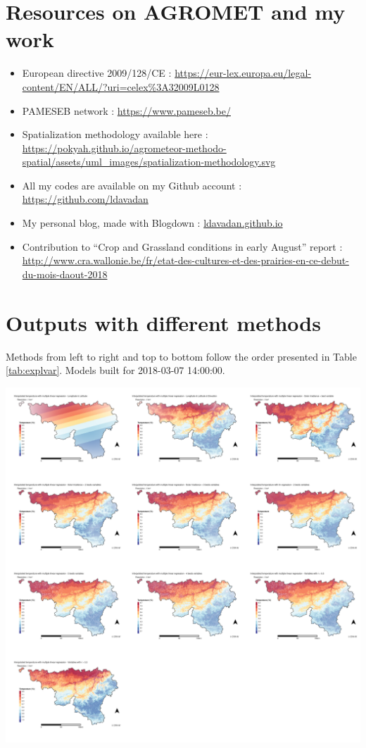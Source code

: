 \documentclass[12pt,twoside]{reedthesis}
\theoremstyle{definition}
\theoremstyle{definition}
\theoremstyle{definition}
\theoremstyle{remark}
\begin{document}
\chapter{Resources on AGROMET and my
work}\label{resources-on-agromet-and-my-work}
\begin{itemize}
\item
  European directive 2009/128/CE :
  \url{https://eur-lex.europa.eu/legal-content/EN/ALL/?uri=celex\%3A32009L0128}
\item
  PAMESEB network : \url{https://www.pameseb.be/}
\item
  Spatialization methodology available here :
  \url{https://pokyah.github.io/agrometeor-methodo-spatial/assets/uml_images/spatialization-methodology.svg}
\item
  All my codes are available on my Github account :
  \url{https://github.com/ldavadan}
\item
  My personal blog, made with Blogdown : \url{ldavadan.github.io}
\item
  Contribution to ``Crop and Grassland conditions in early August''
  report :
  \url{http://www.cra.wallonie.be/fr/etat-des-cultures-et-des-prairies-en-ce-debut-du-mois-daout-2018}
\end{itemize}
\chapter{Outputs with different
methods}\label{outputs-with-different-methods}

Methods from left to right and top to bottom follow the order presented
in Table \ref{tab:explvar}. Models built for 2018-03-07 14:00:00.
\begin{center}\includegraphics[width=1\linewidth]{figure/2018-03-07_14} \end{center}
\end{document}
